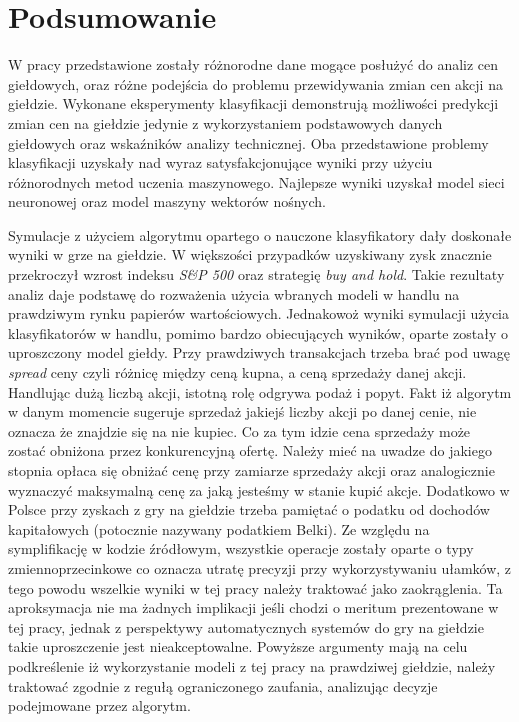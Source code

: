 \documentclass[a4paper, twoside, 11pt, openright]{article}
\begin{document}
\newpage 
 
\section{Podsumowanie}

W pracy przedstawione zostały różnorodne dane mogące posłużyć do analiz cen giełdowych, oraz różne podejścia do problemu przewidywania zmian cen akcji na giełdzie. Wykonane eksperymenty klasyfikacji demonstrują możliwości predykcji zmian cen na giełdzie jedynie z wykorzystaniem podstawowych danych giełdowych oraz wskaźników analizy technicznej. Oba przedstawione problemy klasyfikacji uzyskały nad wyraz satysfakcjonujące wyniki przy użyciu różnorodnych metod uczenia maszynowego. Najlepsze wyniki uzyskał model sieci neuronowej oraz model maszyny wektorów nośnych.

\bigskip

Symulacje z użyciem algorytmu opartego o nauczone klasyfikatory dały doskonałe wyniki w grze na giełdzie. W większości przypadków uzyskiwany zysk znacznie przekroczył wzrost indeksu \textit{S\&P 500} oraz strategię \textit{buy and hold}. Takie rezultaty analiz daje podstawę do rozważenia użycia wbranych modeli w handlu na prawdziwym rynku papierów wartościowych. Jednakowoż wyniki symulacji użycia klasyfikatorów w handlu, pomimo bardzo obiecujących wyników, oparte zostały o uproszczony model giełdy. Przy prawdziwych transakcjach trzeba brać pod uwagę \textit{spread} ceny czyli różnicę między ceną kupna, a ceną sprzedaży danej akcji. Handlując dużą liczbą akcji, istotną rolę odgrywa podaż i popyt. Fakt iż algorytm w danym momencie sugeruje sprzedaż jakiejś liczby akcji po danej cenie, nie oznacza że znajdzie się na nie kupiec. Co za tym idzie cena sprzedaży może zostać obniżona przez konkurencyjną ofertę. Należy mieć na uwadze do jakiego stopnia opłaca się obniżać cenę przy zamiarze sprzedaży akcji oraz analogicznie wyznaczyć maksymalną cenę za jaką jesteśmy w stanie kupić akcje.  Dodatkowo w Polsce przy zyskach z gry na giełdzie trzeba pamiętać o podatku od dochodów kapitałowych (potocznie nazywany podatkiem Belki). Ze względu na symplifikację w kodzie źródłowym, wszystkie operacje zostały oparte o typy zmiennoprzecinkowe co oznacza utratę precyzji przy wykorzystywaniu ułamków, z tego powodu wszelkie wyniki w tej pracy należy traktować jako zaokrąglenia. Ta aproksymacja nie ma żadnych implikacji jeśli chodzi o meritum prezentowane w tej pracy, jednak z perspektywy automatycznych systemów do gry na giełdzie takie uproszczenie jest nieakceptowalne. Powyższe argumenty mają na celu podkreślenie iż wykorzystanie modeli z tej pracy na prawdziwej giełdzie, należy traktować zgodnie z regułą ograniczonego zaufania, analizując decyzje podejmowane przez algorytm.
\end{document}
